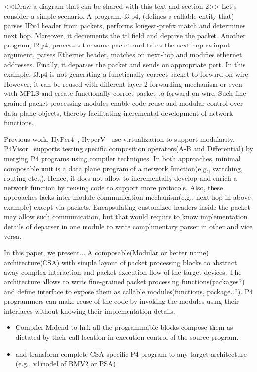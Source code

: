 \documentclass[10pt,sigconf,letterpaper,anonymous]{acmart}
\begin{document}
<<Draw a diagram that can be shared with this text and section 2>>
Let's consider a simple scenario. A program, l3.p4, (defines a callable entity that) parses IPv4 header from packets, performs longest-prefix match and determines next hop. 
Moreover, it decrements the ttl field and deparse the packet. 
Another program, l2.p4, processes the same packet and takes the next hop as input argument, parses Ethernet header, matches on next-hop and modifies ethernet addresses.
Finally, it deparses the packet and sends on appropriate port.
In this example, l3.p4 is not generating a functionally correct packet to forward on wire. 
However, it can be reused with different layer-2 forwarding mechanism or even with MPLS and create functionally correct packet to forward on wire.
Such fine-grained packet processing modules enable code reuse and modular control over data plane objects, thereby facilitating incremental development of network functions. 



Previous work, HyPer4~\cite{Hancock:2016:HUP:2999572.2999607}, HyperV~\cite{8038396} use virtualization to support modularity.
P4Visor~\cite{Zheng:2018:PLV:3281411.3281436} supports testing specific composition operators(A-B and Differential) by merging P4 programs using compiler techniques.
In both approaches, minimal composable unit is a data plane program of a network function(e.g., switching, routing etc.,). 
Hence, it does not allow to incrementally develop and enrich a network function by reusing code to support more protocols.
Also, these approaches lacks inter-module communication mechanism(e.g., next hop in above example) except via packets.
Encapsulating customized headers inside the packet may allow such communication, but that would require to know
implementation details of deparser in one module to write complimentary parser in other and vice versa. 


In this paper, we present...
A composable(Modular or better name) architecture(CSA) with simple layout of packet processing blocks to abstract away complex interaction and packet execution flow of the target devices.
The architecture allows to write fine-grained packet processing functions(packages?) and define interface to expose them as callable modules(functions, package..?).
P4 programmers can make reuse of the code by invoking the modules using their interfaces without knowing their implementation details.
\begin{itemize}
 \item Compiler Midend to link all the programmable blocks compose them as dictated by their call location in execution-control of the source program.
 \item and transform complete CSA specific P4 program to any target architecture (e.g., v1model of BMV2 or PSA)
\end{itemize}
\end{document}
